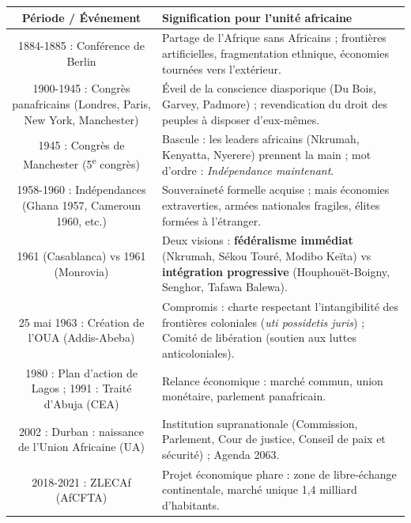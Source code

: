 \documentclass[11pt]{article}
\begin{document}
\begin{experience}
\begin{center}
\begin{tabularx}{\linewidth}{|c|X|}\hline
\rowcolor{popblueL}
\textbf{Période / Événement} & \textbf{Signification pour l'unité africaine} \\ \hline
1884-1885 : Conférence de Berlin & Partage de l'Afrique sans Africains ; frontières artificielles, fragmentation ethnique, économies tournées vers l'extérieur. \\ \hline
1900-1945 : Congrès panafricains (Londres, Paris, New York, Manchester) & Éveil de la conscience diasporique (Du Bois, Garvey, Padmore) ; revendication du droit des peuples à disposer d'eux-mêmes. \\ \hline
1945 : Congrès de Manchester (5\textsuperscript{e} congrès) & Bascule : les leaders africains (Nkrumah, Kenyatta, Nyerere) prennent la main ; mot d'ordre : \emph{Indépendance maintenant}. \\ \hline
1958-1960 : Indépendances (Ghana 1957, Cameroun 1960, etc.) & Souveraineté formelle acquise ; mais économies extraverties, armées nationales fragiles, élites formées à l'étranger. \\ \hline
1961 (Casablanca) vs 1961 (Monrovia) & Deux visions : \textbf{fédéralisme immédiat} (Nkrumah, Sékou Touré, Modibo Keïta) vs \textbf{intégration progressive} (Houphouët-Boigny, Senghor, Tafawa Balewa). \\ \hline
25 mai 1963 : Création de l'OUA (Addis-Abeba) & Compromis : charte respectant l'intangibilité des frontières coloniales (\emph{uti possidetis juris}) ; Comité de libération (soutien aux luttes anticoloniales). \\ \hline
1980 : Plan d'action de Lagos ; 1991 : Traité d'Abuja (CEA) & Relance économique : marché commun, union monétaire, parlement panafricain. \\ \hline
2002 : Durban : naissance de l'Union Africaine (UA) & Institution supranationale (Commission, Parlement, Cour de justice, Conseil de paix et sécurité) ; Agenda 2063. \\ \hline
2018-2021 : ZLECAf (AfCFTA) & Projet économique phare : zone de libre-échange continentale, marché unique 1,4 milliard d'habitants. \\ \hline
\end{tabularx}
\end{center}
\end{experience}
\end{document}
